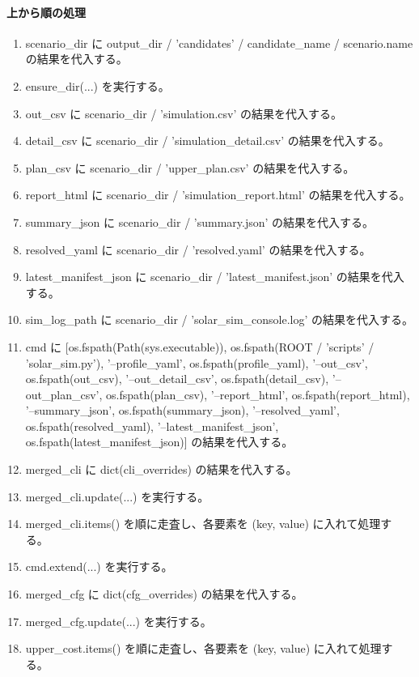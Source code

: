 \documentclass[a4paper,11pt]{article}
\begin{document}
            \paragraph{上から順の処理}
            \begin{enumerate}[leftmargin=1.8em]
            \item scenario\_dir に output\_dir / 'candidates' / candidate\_name / scenario.name の結果を代入する。
\item ensure\_dir(...) を実行する。
\item out\_csv に scenario\_dir / 'simulation.csv' の結果を代入する。
\item detail\_csv に scenario\_dir / 'simulation\_detail.csv' の結果を代入する。
\item plan\_csv に scenario\_dir / 'upper\_plan.csv' の結果を代入する。
\item report\_html に scenario\_dir / 'simulation\_report.html' の結果を代入する。
\item summary\_json に scenario\_dir / 'summary.json' の結果を代入する。
\item resolved\_yaml に scenario\_dir / 'resolved.yaml' の結果を代入する。
\item latest\_manifest\_json に scenario\_dir / 'latest\_manifest.json' の結果を代入する。
\item sim\_log\_path に scenario\_dir / 'solar\_sim\_console.log' の結果を代入する。
\item cmd に [os.fspath(Path(sys.executable)), os.fspath(ROOT / 'scripts' / 'solar\_sim.py'), '--profile\_yaml', os.fspath(profile\_yaml), '--out\_csv', os.fspath(out\_csv), '--out\_detail\_csv', os.fspath(detail\_csv), '--out\_plan\_csv', os.fspath(plan\_csv), '--report\_html', os.fspath(report\_html), '--summary\_json', os.fspath(summary\_json), '--resolved\_yaml', os.fspath(resolved\_yaml), '--latest\_manifest\_json', os.fspath(latest\_manifest\_json)] の結果を代入する。
\item merged\_cli に dict(cli\_overrides) の結果を代入する。
\item merged\_cli.update(...) を実行する。
\item merged\_cli.items() を順に走査し、各要素を (key, value) に入れて処理する。
\item   cmd.extend(...) を実行する。
\item merged\_cfg に dict(cfg\_overrides) の結果を代入する。
\item merged\_cfg.update(...) を実行する。
\item upper\_cost.items() を順に走査し、各要素を (key, value) に入れて処理する。

\end{enumerate}
\end{document}
